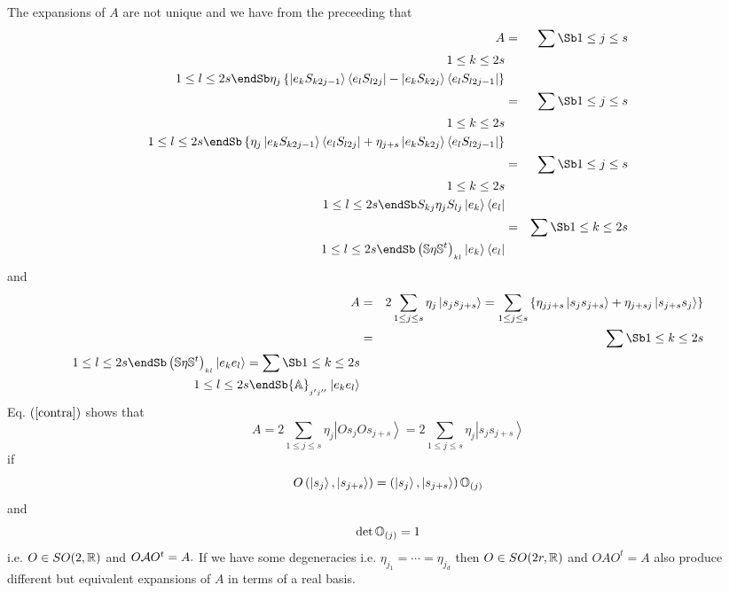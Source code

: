 The expansions of $A$ are not unique and we have from the preceeding that%
\begin{eqnarray}
A &=&\sum\Sb 1\leq j\leq s  \\ 1\leq k\leq 2s  \\ 1\leq l\leq 2s  \endSb %
\eta _{j}\left\{ \left\vert e_{k}S_{k2j-1}\right\rangle \left\langle
e_{l}S_{l2j}\right\vert -\left\vert e_{k}S_{k2j}\right\rangle \left\langle
e_{l}S_{l2j-1}\right\vert \right\}  \nonumber \\
&=&\sum\Sb 1\leq j\leq s  \\ 1\leq k\leq 2s  \\ 1\leq l\leq 2s  \endSb %
\left\{ \eta _{j}\left\vert e_{k}S_{k2j-1}\right\rangle \left\langle
e_{l}S_{l2j}\right\vert +\eta _{j+s}\left\vert e_{k}S_{k2j}\right\rangle
\left\langle e_{l}S_{l2j-1}\right\vert \right\}  \nonumber \\
&=&\sum\Sb 1\leq j\leq s  \\ 1\leq k\leq 2s  \\ 1\leq l\leq 2s  \endSb %
S_{kj}\eta _{j}S_{lj}\left\vert e_{k}\right\rangle \left\langle
e_{l}\right\vert  \nonumber \\
&=&\sum\Sb 1\leq k\leq 2s  \\ 1\leq l\leq 2s  \endSb \left( {\Bbb S}{\bf %
\eta }{\Bbb S}^{t}\right) _{_{kl}}\left\vert e_{k}\right\rangle \left\langle
e_{l}\right\vert
\end{eqnarray}%
and 
\begin{eqnarray}
A &=&2\sum_{1\leq j\leq s}\eta _{j}\left\vert s_{j}s_{j+s}\right\rangle
=\sum_{1\leq j\leq s}\left\{ \eta _{jj+s}\left\vert
s_{j}s_{j+s}\right\rangle +\eta _{j+sj}\left\vert s_{j+s}s_{j}\right\rangle
\right\}  \nonumber \\
&=&\sum\Sb 1\leq k\leq 2s  \\ 1\leq l\leq 2s  \endSb \left( {\Bbb S}{\bf %
\eta }{\Bbb S}^{t}\right) _{_{kl}}\left\vert e_{k}e_{l}\right\rangle =\sum\Sb
1\leq k\leq 2s  \\ 1\leq l\leq 2s  \endSb {\Bbb A}_{_{j^{\prime }j^{\prime
\prime }}}\left\vert e_{k}e_{l}\right\rangle
\end{eqnarray}%
Eq. $\left( \ref{contra}\right) $ shows that 
\begin{equation}
A=2\sum_{1\leq j\leq s}\eta _{j}\left\vert Os_{j}Os_{j+s}\right\rangle
=2\sum_{1\leq j\leq s}\eta _{j}\left\vert s_{j}s_{j+s}\right\rangle
\end{equation}%
if 
\begin{equation}
O\left( \left\vert s_{j}\right\rangle ,\left\vert s_{j+s}\right\rangle
\right) =\left( \left\vert s_{j}\right\rangle ,\left\vert
s_{j+s}\right\rangle \right) {\Bbb O}_{\left( j\right) }
\end{equation}%
and 
\begin{equation}
\det {\Bbb O}_{\left( j\right) }=1
\end{equation}%
i.e. $O\in SO(2,{\Bbb R)}$ and $O{\cal A}O^{t}=A.$ If we have some
degeneracies i.e. $\eta _{j_{1}}=\cdots =\eta _{j_{d}}$ then $O\in SO(2r,%
{\Bbb R)}$ and $OAO^{t}=A$ also produce different but equivalent expansions
of $A$ in terms of a real basis.

